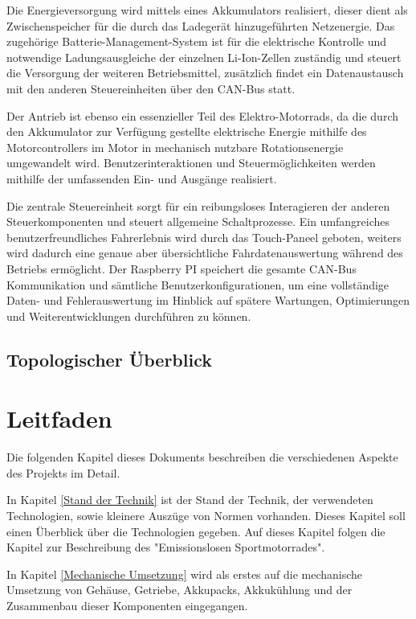 Die Energieversorgung wird mittels eines Akkumulators realisiert, dieser dient als Zwischenspeicher für die durch das Ladegerät hinzugeführten Netzenergie. Das zugehörige Batterie-Management-System ist für die elektrische Kontrolle und notwendige Ladungsausgleiche der einzelnen Li-Ion-Zellen zuständig und steuert die Versorgung der weiteren Betriebsmittel, zusätzlich findet ein Datenaustausch mit den anderen Steuereinheiten über den CAN-Bus statt.

Der Antrieb ist ebenso ein essenzieller Teil des Elektro-Motorrads, da die durch den Akkumulator zur Verfügung gestellte elektrische Energie mithilfe des Motorcontrollers im Motor in mechanisch nutzbare Rotationsenergie umgewandelt wird. Benutzerinteraktionen und Steuermöglichkeiten werden mithilfe der umfassenden Ein- und Ausgänge realisiert.

Die zentrale Steuereinheit sorgt für ein reibungsloses Interagieren der anderen Steuerkomponenten und steuert allgemeine Schaltprozesse. Ein umfangreiches benutzerfreundliches Fahrerlebnis wird durch das Touch-Paneel geboten, weiters wird dadurch eine genaue aber übersichtliche Fahrdatenauswertung während des Betriebs ermöglicht. Der Raspberry PI speichert die gesamte CAN-Bus Kommunikation und sämtliche Benutzerkonfigurationen, um eine vollständige Daten- und Fehlerauswertung im Hinblick auf spätere Wartungen, Optimierungen und Weiterentwicklungen durchführen zu können.

\subsection{Topologischer Überblick}

\newpage

\section{Leitfaden}

Die folgenden Kapitel dieses Dokuments beschreiben die verschiedenen Aspekte des Projekts im Detail. 

In Kapitel \ref{Stand der Technik} ist der Stand der Technik, der verwendeten Technologien, sowie kleinere Auszüge von Normen vorhanden. Dieses Kapitel soll einen Überblick über die Technologien gegeben. Auf dieses Kapitel folgen die Kapitel zur Beschreibung des "Emissionslosen Sportmotorrades". 

In Kapitel \ref{Mechanische Umsetzung} wird als erstes auf die mechanische Umsetzung von Gehäuse, Getriebe, Akkupacks, Akkukühlung und der Zusammenbau dieser Komponenten eingegangen. 

